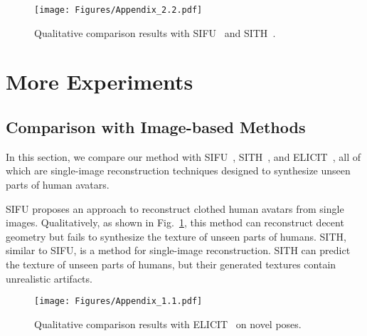 \begin{figure}[!t]
  \centering
  \texttt{[image: Figures/Appendix\_2.2.pdf]}
  \caption{Qualitative comparison results with SIFU~\cite{Zhang2024SIFU} and SITH~\cite{ho2024sith}.}
  \label{fig:SIFU}
\end{figure}
\section{More Experiments}



\subsection{Comparison with Image-based Methods \label{resultImagebased}}

In this section, we compare our method with SIFU~\cite{Zhang2024SIFU}, SITH~\cite{ho2024sith}, and ELICIT~\cite{huang2022elicit}, all of which are single-image reconstruction techniques designed to synthesize unseen parts of human avatars.

SIFU proposes an approach to reconstruct clothed human avatars from single images. Qualitatively, as shown in Fig.~\ref{fig:SIFU}, this method can reconstruct decent geometry but fails to synthesize the texture of unseen parts of humans. SITH, similar to SIFU, is a method for single-image reconstruction. SITH can predict the texture of unseen parts of humans, but their generated textures contain unrealistic artifacts.
\begin{figure}[!t]
  \centering
  \texttt{[image: Figures/Appendix\_1.1.pdf]}
  \caption{Qualitative comparison results with ELICIT~\cite{huang2022elicit} on novel poses.}
  \label{fig:ELICIT}
\end{figure}

